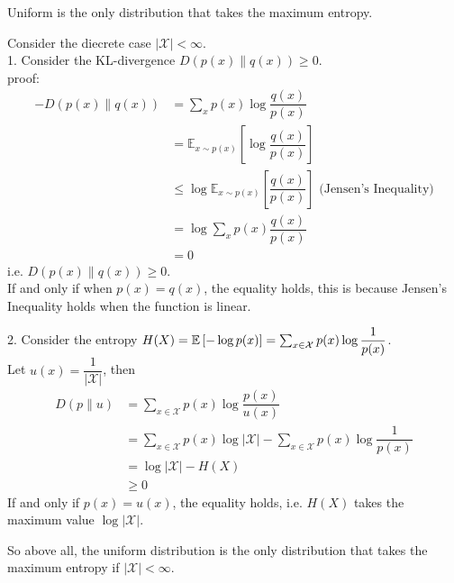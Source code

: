 \begin{homeworkProblem}
Uniform is the only distribution that takes the maximum entropy.

\solution

Consider the diecrete case $|\mathcal{X}|<\infty$. \\

1. Consider the KL-divergence $D\left(p(x)\|q(x)\right)\geq 0$.\\
proof:
\begin{align*}
-D\left(p(x)\|q(x)\right) &= \sum_{x}p(x)\log\dfrac{q(x)}{p(x)} \\
&= \mathbb{E}_{x\sim p(x)}\left[\log\dfrac{q(x)}{p(x)}\right] \\
&\leq \log\mathbb{E}_{x\sim p(x)}\left[\dfrac{q(x)}{p(x)}\right] \text{\ \ \ \ (Jensen's Inequality)} \\
&= \log\sum_{x}p(x)\dfrac{q(x)}{p(x)} \\
&= 0
\end{align*}
i.e. $D\left(p(x)\|q(x)\right)\geq 0$. \\
If and only if when $p(x)=q(x)$, the equality holds, this is because Jensen's Inequality holds when the function is linear.

2. Consider the entropy $H(X)=\mathbb{E}\left[-\log p(x)\right]=\sum_{x\in\mathcal{X}}p(x)\log\dfrac{1}{p(x)}$. \\
Let $u(x)=\dfrac{1}{|\mathcal{X}|}$, then
\begin{align*}
D\left(p\|u\right) &= \sum_{x\in\mathcal{X}}p(x)\log\dfrac{p(x)}{u(x)} \\
&= \sum_{x\in\mathcal{X}}p(x)\log|\mathcal{X}| - \sum_{x\in\mathcal{X}}p(x)\log\dfrac{1}{p(x)} \\
&= \log|\mathcal{X}| - H(X) \\
&\geq 0
\end{align*}
If and only if $p(x)=u(x)$, the equality holds, i.e. $H(X)$ takes the maximum value $\log|\mathcal{X}|$.

So above all, the uniform distribution is the only distribution that takes the maximum entropy if $|\mathcal{X}|<\infty$.

\end{homeworkProblem}